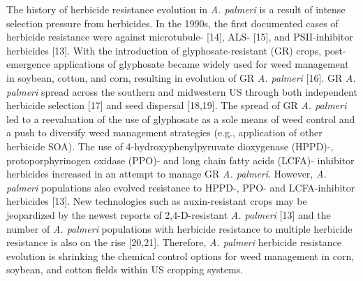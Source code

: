 \documentclass[10pt,letterpaper]{article}
\begin{document}
The history of herbicide resistance evolution in \emph{A. palmeri} is a
result of intense selection pressure from herbicides. In the 1990s, the
first documented cases of herbicide resistance were against microtubule-
{[}14{]}, ALS- {[}15{]}, and PSII-inhibitor herbicides {[}13{]}. With
the introduction of glyphosate-resistant (GR) crops, post-emergence
applications of glyphosate became widely used for weed management in
soybean, cotton, and corn, resulting in evolution of GR \emph{A.
palmeri} {[}16{]}. GR \emph{A. palmeri} spread across the southern and
midwestern US through both independent herbicide selection {[}17{]} and
seed dispersal {[}18,19{]}. The spread of GR \emph{A. palmeri} led to a
reevaluation of the use of glyphosate as a sole means of weed control
and a push to diversify weed management strategies (e.g., application of
other herbicide SOA). The use of 4-hydroxyphenylpyruvate dioxygenase
(HPPD)-, protoporphyrinogen oxidase (PPO)- and long chain fatty acids
(LCFA)- inhibitor herbicides increased in an attempt to manage GR
\emph{A. palmeri}. However, \emph{A. palmeri} populations also evolved
resistance to HPPD-, PPO- and LCFA-inhibitor herbicides {[}13{]}. New
technologies such as auxin-resistant crops may be jeopardized by the
newest reports of 2,4-D-resistant \emph{A. palmeri} {[}13{]} and the
number of \emph{A. palmeri} populations with herbicide resistance to
multiple herbicide resistance is also on the rise {[}20,21{]}.
Therefore, \emph{A. palmeri} herbicide resistance evolution is shrinking
the chemical control options for weed management in corn, soybean, and
cotton fields within US cropping systems.
\end{document}
